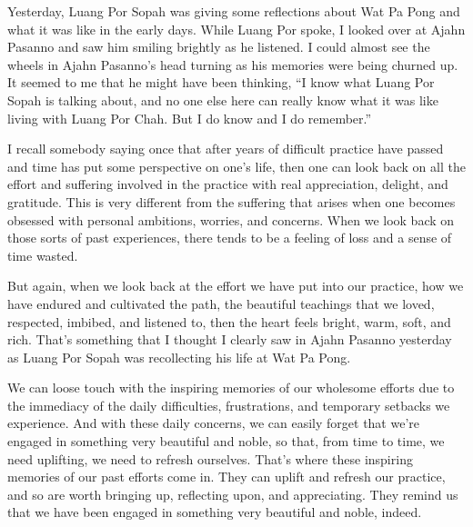 
Yesterday, Luang Por Sopah was giving some reflections about Wat Pa 
Pong and what it was like in the early days. While Luang Por spoke, I 
looked over at Ajahn Pasanno and saw him smiling brightly as he 
listened. I could almost see the wheels in Ajahn Pasanno's head turning 
as his memories were being churned up. It seemed to me that he might 
have been thinking, ``I know what Luang Por Sopah is talking about, and 
no one else here can really know what it was like living with Luang Por 
Chah. But I do know and I do remember.''

I recall somebody saying once that after years of difficult practice 
have passed and time has put some perspective on one's life, then one 
can look back on all the effort and suffering involved in the practice 
with real appreciation, delight, and gratitude. This is very different 
from the suffering that arises when one becomes obsessed with personal 
ambitions, worries, and concerns. When we look back on those sorts of 
past experiences, there tends to be a feeling of loss and a sense of 
time wasted.

But again, when we look back at the effort we have put into our 
practice, how we have endured and cultivated the path, the beautiful 
teachings that we loved, respected, imbibed, and listened to, then the 
heart feels bright, warm, soft, and rich. That's something that I 
thought I clearly saw in Ajahn Pasanno yesterday as Luang Por Sopah was 
recollecting his life at Wat Pa Pong.

We can loose touch with the inspiring memories of our wholesome efforts 
due to the immediacy of the daily difficulties, frustrations, and 
temporary setbacks we experience. And with these daily concerns, we can 
easily forget that we're engaged in something very beautiful and noble, 
so that, from time to time, we need uplifting, we need to refresh 
ourselves. That's where these inspiring memories of our past efforts 
come in. They can uplift and refresh our practice, and so are worth 
bringing up, reflecting upon, and appreciating. They remind us that we 
have been engaged in something very beautiful and noble, indeed.

